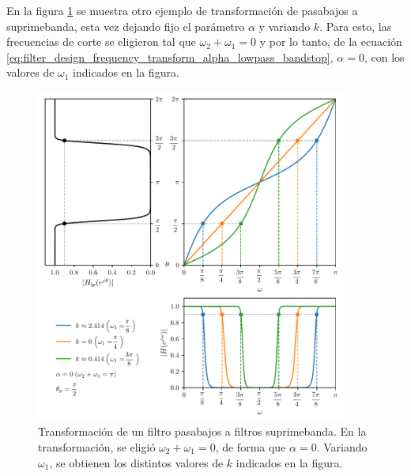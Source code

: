 \documentclass[a4paper]{report}
\begin{document}
En la figura \ref{fig:filter_design_frequency_transformations_low_bandstop_k} se muestra otro ejemplo de transformación de pasabajos a suprimebanda, esta vez dejando fijo el parámetro \(\alpha\) y variando \(k\). Para esto, las frecuencias de corte se eligieron tal que \(\omega_2+\omega_1=0\) y por lo tanto, de la ecuación \ref{eq:filter_design_frequency_transform_alpha_lowpass_bandstop}, \(\alpha=0\), con los valores de \(\omega_1\) indicados en la figura. 
\begin{figure}[!htb]
 \begin{center}
 \includegraphics[width=0.91\textwidth]{figuras/filter_design_frequency_transformations_low_bandstop_k.pdf}
 \caption{\label{fig:filter_design_frequency_transformations_low_bandstop_k} Transformación de un filtro pasabajos a filtros suprimebanda. En la transformación, se eligió \(\omega_2+\omega_1=0\), de forma que \(\alpha=0\). Variando \(\omega_1\), se obtienen los distintos valores de \(k\) indicados en la figura.}
 \end{center}
\end{figure}
\end{document}
